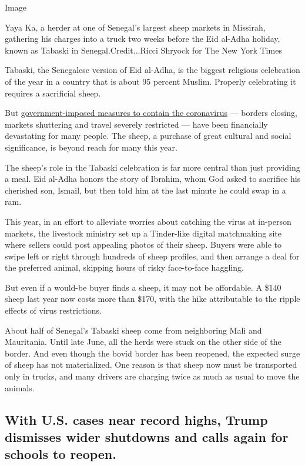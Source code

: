 Image

Yaya Ka, a herder at one of Senegal's largest sheep markets in Missirah,
gathering his charges into a truck two weeks before the Eid al-Adha
holiday, known as Tabaski in Senegal.Credit...Ricci Shryock for The New
York Times

Tabaski, the Senegalese version of Eid al-Adha, is the biggest religious
celebration of the year in a country that is about 95 percent Muslim.
Properly celebrating it requires a sacrificial sheep.

But
\href{https://www.nytimes.com/2020/07/29/world/africa/senegal-tabaski-sheep-eid-adha.html}{government-imposed
measures to contain the coronavirus} --- borders closing, markets
shuttering and travel severely restricted --- have been financially
devastating for many people. The sheep, a purchase of great cultural and
social significance, is beyond reach for many this year.

The sheep's role in the Tabaski celebration is far more central than
just providing a meal. Eid al-Adha honors the story of Ibrahim, whom God
asked to sacrifice his cherished son, Ismail, but then told him at the
last minute he could swap in a ram.

This year, in an effort to alleviate worries about catching the virus at
in-person markets, the livestock ministry set up a Tinder-like digital
matchmaking site where sellers could post appealing photos of their
sheep. Buyers were able to swipe left or right through hundreds of sheep
profiles, and then arrange a deal for the preferred animal, skipping
hours of risky face-to-face haggling.

But even if a would-be buyer finds a sheep, it may not be affordable. A
\$140 sheep last year now costs more than \$170, with the hike
attributable to the ripple effects of virus restrictions.

About half of Senegal's Tabaski sheep come from neighboring Mali and
Mauritania. Until late June, all the herds were stuck on the other side
of the border. And even though the bovid border has been reopened, the
expected surge of sheep has not materialized. One reason is that sheep
now must be transported only in trucks, and many drivers are charging
twice as much as usual to move the animals.

\hypertarget{with-us-cases-near-record-highs-trump-dismisses-wider-shutdowns-and-calls-again-for-schools-to-reopen}{%
\subsection{With U.S. cases near record highs, Trump dismisses wider
shutdowns and calls again for schools to
reopen.}\label{with-us-cases-near-record-highs-trump-dismisses-wider-shutdowns-and-calls-again-for-schools-to-reopen}}

